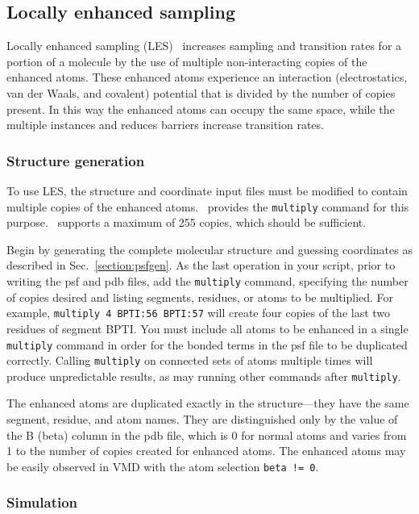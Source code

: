 \subsection{Locally enhanced sampling}
\label{section:les}

Locally enhanced sampling (LES)~\cite{ROIT91,SIMM98,SIMM00} increases
sampling and transition rates for a portion of a molecule by the use of
multiple non-interacting copies of the enhanced atoms.  These enhanced
atoms experience an interaction (electrostatics, van der Waals, and
covalent) potential that is divided by the number of copies present.
In this way the enhanced atoms can occupy the same space, while the
multiple instances and reduces barriers increase transition rates.

\subsubsection{Structure generation}

To use LES, the structure and coordinate input files must be modified to
contain multiple copies of the enhanced atoms.  \PSFGEN\ provides the
{\tt multiply} command for this purpose.  \NAMD\ supports a maximum of 255
copies, which should be sufficient.  

Begin by generating the complete molecular structure and guessing
coordinates as described in Sec.~\ref{section:psfgen}.  As the last
operation in your script, prior to writing the psf and pdb files, add
the {\tt multiply} command, specifying the number of copies desired and
listing segments, residues, or atoms to be multiplied.  For example,
\verb#multiply 4 BPTI:56 BPTI:57# will create four copies of the last
two residues of segment BPTI.  You must include all atoms to be
enhanced in a single {\tt multiply} command in order for the bonded
terms in the psf file to be duplicated correctly.  Calling {\tt multiply}
on connected sets of atoms multiple times will produce unpredictable
results, as may running other commands after {\tt multiply}.

The enhanced atoms are duplicated exactly in the structure---they have
the same segment, residue, and atom names.  They are distinguished only
by the value of the B (beta) column in the pdb file, which is 0 for
normal atoms and varies from 1 to the number of copies created for
enhanced atoms.  The enhanced atoms may be easily observed in VMD with
the atom selection \verb#beta != 0#.

\subsubsection{Simulation}

